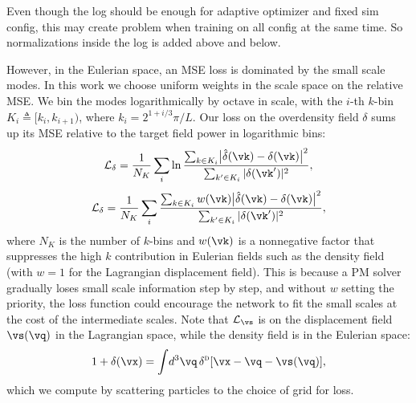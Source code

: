 \documentclass[modern, trackchanges, dvipsnames]{aastex631}
\newcommand{\deltaD}{\delta^\textsc{d}}
\renewcommand{\d}{d}
\newcommand{\cL}{\mathcal{L}}
\newcommand{\YL}[1]{\textcolor{Bittersweet}{#1}}
\begin{document}
\YL{Even though the log should be enough for adaptive optimizer and
fixed sim config, this may create problem when training on all config at
the same time. So normalizations inside the log is added above and
below.}

However, in the Eulerian space, an MSE loss is dominated by the small
scale modes.
In this work we choose uniform weights in the scale space on the
relative MSE.
We bin the modes logarithmically by  octave in scale, with
the $i$-th $k$-bin $K_i \triangleq [k_i, k_{i+1})$, where $k_i =
2^{1+i/3} \pi / L$.
Our loss on the overdensity field $\delta$ sums up its MSE relative to
the target field power in logarithmic bins:
%
\begin{equation}
\cL_\delta = \frac1{N_K} \sum_i \ln
\frac{\sum_{k \in K_i} \bigl| \hat\delta(\vk) - \delta(\vk) \bigr|^2}
     {\sum_{k' \in K_i} |\delta(\vk')|^2},
\end{equation}
%
\begin{equation}
\cL_\delta = \frac1{N_K} \sum_i
\frac{\sum_{k \in K_i} w(\vk)
      \bigl| \hat\delta(\vk) - \delta(\vk) \bigr|^2}
     {\sum_{k' \in K_i} |\delta(\vk')|^2},
\end{equation}
%
where $N_K$ is the number of $k$-bins and $w(\vk)$ is a nonnegative
factor that suppresses the high $k$ contribution in Eulerian fields such
as the density field (with $w=1$ for the Lagrangian displacement field).
This is because a PM solver gradually loses small scale information step
by step, and without $w$ setting the priority, the loss function could
encourage the network to fit the small scales at the cost of the
intermediate scales.
Note that $\cL_\vs$ is on the displacement field $\vs(\vq)$ in the
Lagrangian space, while the density field is in the Eulerian space:
%
\begin{equation}
1 + \delta(\vx) = \int\!\d^3\vq\, \deltaD[ \vx - \vq - \vs(\vq)],
\end{equation}
%
which we compute by scattering particles to the choice of grid for loss.
\end{document}
